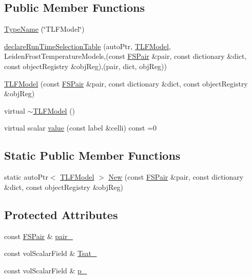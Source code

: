 \subsection*{Public Member Functions}
\begin{DoxyCompactItemize}
\item 
\hyperlink{classFoam_1_1TLFModel_ad9913b4d3e6056f7d0a77c6454f00a12}{Type\+Name} (\char`\"{}T\+L\+F\+Model\char`\"{})
\item 
\hyperlink{classFoam_1_1TLFModel_ae904e326af73fe453ab58f8bc82370ef}{declare\+Run\+Time\+Selection\+Table} (auto\+Ptr, \hyperlink{classFoam_1_1TLFModel}{T\+L\+F\+Model}, Leiden\+Frost\+Temperature\+Models,(const \hyperlink{classFoam_1_1FSPair}{F\+S\+Pair} \&pair, const dictionary \&dict, const object\+Registry \&obj\+Reg),(pair, dict, obj\+Reg))
\item 
\hyperlink{classFoam_1_1TLFModel_a7b21d2cae1fe02e7c13782ec3e7bf85f}{T\+L\+F\+Model} (const \hyperlink{classFoam_1_1FSPair}{F\+S\+Pair} \&pair, const dictionary \&dict, const object\+Registry \&obj\+Reg)
\item 
virtual \hyperlink{classFoam_1_1TLFModel_a88d7bea25425a37d229d7aa32209ab3b}{$\sim$\+T\+L\+F\+Model} ()
\item 
virtual scalar \hyperlink{classFoam_1_1TLFModel_a139457cae4c5e04785e143fd8b9ed092}{value} (const label \&celli) const =0
\end{DoxyCompactItemize}
\subsection*{Static Public Member Functions}
\begin{DoxyCompactItemize}
\item 
static auto\+Ptr$<$ \hyperlink{classFoam_1_1TLFModel}{T\+L\+F\+Model} $>$ \hyperlink{classFoam_1_1TLFModel_af566bef79ea9ba0081e18a38047d50a9}{New} (const \hyperlink{classFoam_1_1FSPair}{F\+S\+Pair} \&pair, const dictionary \&dict, const object\+Registry \&obj\+Reg)
\end{DoxyCompactItemize}
\subsection*{Protected Attributes}
\begin{DoxyCompactItemize}
\item 
const \hyperlink{classFoam_1_1FSPair}{F\+S\+Pair} \& \hyperlink{classFoam_1_1TLFModel_a587e19a1b4f4b498d2604d20c093a73b}{pair\+\_\+}
\item 
const vol\+Scalar\+Field \& \hyperlink{classFoam_1_1TLFModel_a850ac645f80266cb218d8aa58aac9bc0}{Tsat\+\_\+}
\item 
const vol\+Scalar\+Field \& \hyperlink{classFoam_1_1TLFModel_a4c9ce31e482786bbeeed352570fd8d09}{p\+\_\+}
\end{DoxyCompactItemize}



